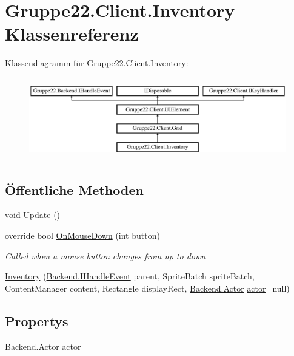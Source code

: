 \hypertarget{class_gruppe22_1_1_client_1_1_inventory}{\section{Gruppe22.\-Client.\-Inventory Klassenreferenz}
\label{class_gruppe22_1_1_client_1_1_inventory}
}
Klassendiagramm für Gruppe22.\-Client.\-Inventory\-:\begin{figure}[H]
\begin{center}
\leavevmode
\includegraphics[height=3.589744cm]{class_gruppe22_1_1_client_1_1_inventory}
\end{center}
\end{figure}
\subsection*{Öffentliche Methoden}
\begin{DoxyCompactItemize}
\item 
void \hyperlink{class_gruppe22_1_1_client_1_1_inventory_a8dfc98c6006ae3897382f7e68b3fec67}{Update} ()
\item 
override bool \hyperlink{class_gruppe22_1_1_client_1_1_inventory_a591cf287beb11b3d2f330d8f6b812e4e}{On\-Mouse\-Down} (int button)
\begin{DoxyCompactList}\small\item\em Called when a mouse button changes from up to down \end{DoxyCompactList}\item 
\hyperlink{class_gruppe22_1_1_client_1_1_inventory_ab894c3b2a1f2985fb5714b4e3601f9b1}{Inventory} (\hyperlink{interface_gruppe22_1_1_backend_1_1_i_handle_event}{Backend.\-I\-Handle\-Event} parent, Sprite\-Batch sprite\-Batch, Content\-Manager content, Rectangle display\-Rect, \hyperlink{class_gruppe22_1_1_backend_1_1_actor}{Backend.\-Actor} \hyperlink{class_gruppe22_1_1_client_1_1_inventory_ab3465a261fd02252169362b4d110ee23}{actor}=null)
\end{DoxyCompactItemize}
\subsection*{Propertys}
\begin{DoxyCompactItemize}
\item 
\hyperlink{class_gruppe22_1_1_backend_1_1_actor}{Backend.\-Actor} \hyperlink{class_gruppe22_1_1_client_1_1_inventory_ab3465a261fd02252169362b4d110ee23}{actor}
\end{DoxyCompactItemize}
